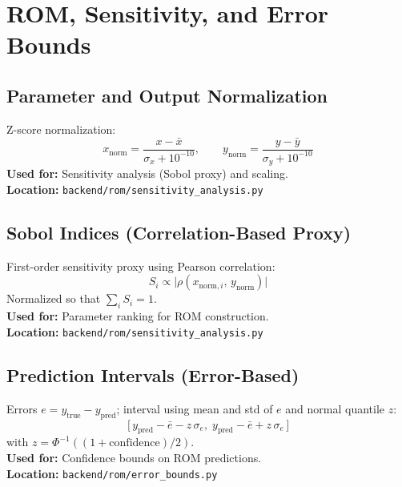 \documentclass[11pt,a4paper]{article}
\begin{document}
\section{ROM, Sensitivity, and Error Bounds}

\subsection{Parameter and Output Normalization}
Z-score normalization:
\begin{equation}
x_{\mathrm{norm}} = \frac{x - \bar{x}}{\sigma_x + 10^{-10}},\qquad
y_{\mathrm{norm}} = \frac{y - \bar{y}}{\sigma_y + 10^{-10}}
\end{equation}
\textbf{Used for:} Sensitivity analysis (Sobol proxy) and scaling. \\
\textbf{Location:} \texttt{backend/rom/sensitivity\_analysis.py}

\subsection{Sobol Indices (Correlation-Based Proxy)}
First-order sensitivity proxy using Pearson correlation:
\begin{equation}
S_i \propto \bigl| \rho(x_{\mathrm{norm},i},\, y_{\mathrm{norm}}) \bigr|
\end{equation}
Normalized so that \(\sum_i S_i = 1\). \\
\textbf{Used for:} Parameter ranking for ROM construction. \\
\textbf{Location:} \texttt{backend/rom/sensitivity\_analysis.py}

\subsection{Prediction Intervals (Error-Based)}
Errors \(e = y_{\mathrm{true}} - y_{\mathrm{pred}}\); interval using mean and std of \(e\) and normal quantile \(z\):
\begin{equation}
\bigl[\, y_{\mathrm{pred}} - \bar{e} - z\, \sigma_e,\;
y_{\mathrm{pred}} - \bar{e} + z\, \sigma_e\,\bigr]
\end{equation}
with \(z = \Phi^{-1}((1 + \mathrm{confidence})/2)\). \\
\textbf{Used for:} Confidence bounds on ROM predictions. \\
\textbf{Location:} \texttt{backend/rom/error\_bounds.py}
\end{document}
